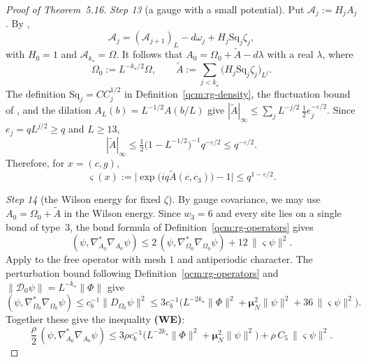 \documentclass[11pt,letterpaper,reqno]{amsart}
\theoremstyle{definition}
\begin{document}
\begin{proof}[Proof of Theorem~5.16]
\emph{Step 13} (a gauge with a small potential).
Put $\mathscr A_j:=H_jA_j$.
By \cite[equation~(10.29)]{QEDConstruction},
\begin{equation*}
\mathscr A_j=(\mathscr A_{j+1})_L-d\omega_j+H_j\mathrm{Sq}_j\zeta_j,
\end{equation*}
with $H_0=1$ and $\mathscr A_{k_\star}=\Omega$.
It follows that $A_0=\Omega_0+\tilde A-d\lambda$ with a real $\lambda$, where
\begin{equation*}
\Omega_0:=L^{-k_\star/2}\Omega,\qquad\tilde A:=\sum_{j<k_\star}\bigl(H_j\mathrm{Sq}_j\zeta_j\bigr)_{L^j}.
\end{equation*}
The definition $\mathrm{Sq}_j=CC_j^{1/2}$ in Definition~\ref{qcm:rg-density}, the fluctuation bound of \cite[Proposition~10.4]{QEDConstruction}, and the dilation $A_L(b)=L^{-1/2}A(b/L)$ give $|\tilde A|_\infty\le\sum_jL^{-j/2}\,\frac12e_j^{-\varepsilon/2}$.
Since $e_j=qL^{j/2}\ge q$ and $L\ge13$,
\begin{equation*}
|\tilde A|_\infty\le\tfrac12\bigl(1-L^{-1/2}\bigr)^{-1}q^{-\varepsilon/2}\le q^{-\varepsilon/2}.
\end{equation*}
Therefore, for $x=(c,g)$,
\begin{equation*}
\varsigma(x):=\bigl|\exp\bigl(iq\tilde A(c,c_3)\bigr)-1\bigr|\le q^{1-\varepsilon/2}.
\end{equation*}

\emph{Step 14} (the Wilson energy for fixed $\zeta$).
By gauge covariance, we may use $A_0=\Omega_0+\tilde A$ in the Wilson energy.
Since $w_3=6$ and every site lies on a single bond of type~$3$, the bond formula of Definition~\ref{qcm:rg-operators} gives
\begin{equation*}
(\psi,\nabla^*_{A_0}\nabla_{A_0}\psi)\le2\,(\psi,\nabla^*_{\Omega_0}\nabla_{\Omega_0}\psi)+12\,\|\varsigma\psi\|^2 .
\end{equation*}
Apply \cite[Proposition~9.4]{QEDConstruction} to the free operator with mesh $1$ and antiperiodic character. The perturbation bound following Definition~\ref{qcm:rg-operators} and $\|\mathcal D_0\psi\|=L^{-k_\star}\|\Phi\|$ give
\begin{equation*}
(\psi,\nabla^*_{\Omega_0}\nabla_{\Omega_0}\psi)\le c_b^{-1}\|D_{\Omega_0}\psi\|^2\le3c_b^{-1}\bigl(L^{-2k_\star}\|\Phi\|^2+\boldsymbol\mu_N^2\|\psi\|^2+36\,\|\varsigma\psi\|^2\bigr).
\end{equation*}
Together these give the inequality \textbf{(WE)}:
\begin{equation}
\tag{WE}
\frac\rho2\,(\psi,\nabla^*_{A_0}\nabla_{A_0}\psi)\le3\rho c_b^{-1}\bigl(L^{-2k_\star}\|\Phi\|^2+\boldsymbol\mu_N^2\|\psi\|^2\bigr)+\rho\,C_5\,\|\varsigma\psi\|^2 .
\end{equation}


\end{proof}
\end{document}
